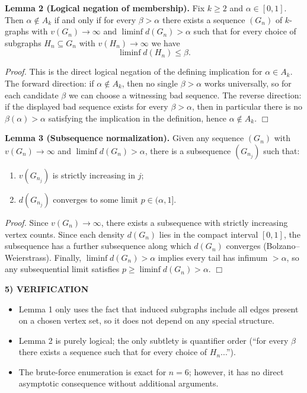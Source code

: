 \medskip
\noindent\textbf{Lemma 2 (Logical negation of membership).}
Fix $k\ge 2$ and $\alpha\in[0,1]$. Then $\alpha\notin A_k$ if and only if for every $\beta>\alpha$ there exists a sequence $(G_n)$ of $k$-graphs with $v(G_n)\to\infty$ and $\liminf d(G_n)>\alpha$ such that for every choice of subgraphs $H_n\subseteq G_n$ with $v(H_n)\to\infty$ we have
\[
\liminf d(H_n)\le \beta.
\]

\noindent\emph{Proof.}
This is the direct logical negation of the defining implication for $\alpha\in A_k$.
The forward direction: if $\alpha\notin A_k$, then no single $\beta>\alpha$ works universally, so for each candidate $\beta$ we can choose a witnessing bad sequence.
The reverse direction: if the displayed bad sequence exists for every $\beta>\alpha$, then in particular there is no $\beta(\alpha)>\alpha$ satisfying the implication in the definition, hence $\alpha\notin A_k$. \hfill$\Box$

\medskip
\noindent\textbf{Lemma 3 (Subsequence normalization).}
Given any sequence $(G_n)$ with $v(G_n)\to\infty$ and $\liminf d(G_n)>\alpha$, there is a subsequence $(G_{n_j})$ such that:
\begin{enumerate}
\item $v(G_{n_j})$ is strictly increasing in $j$;
\item $d(G_{n_j})$ converges to some limit $p\in(\alpha,1]$.
\end{enumerate}

\noindent\emph{Proof.}
Since $v(G_n)\to\infty$, there exists a subsequence with strictly increasing vertex counts.
Since each density $d(G_n)$ lies in the compact interval $[0,1]$, the subsequence has a further subsequence along which $d(G_n)$ converges (Bolzano--Weierstrass).
Finally, $\liminf d(G_n)>\alpha$ implies every tail has infimum $>\alpha$, so any subsequential limit satisfies $p\ge \liminf d(G_n)>\alpha$. \hfill$\Box$

\medskip
\noindent\textbf{5) VERIFICATION}

\begin{itemize}
\item Lemma 1 only uses the fact that induced subgraphs include all edges present on a chosen vertex set, so it does not depend on any special structure.
\item Lemma 2 is purely logical; the only subtlety is quantifier order (``for every $\beta$ there exists a sequence such that for every choice of $H_n$...'').
\item The brute-force enumeration is exact for $n=6$; however, it has no direct asymptotic consequence without additional arguments.
\end{itemize}

